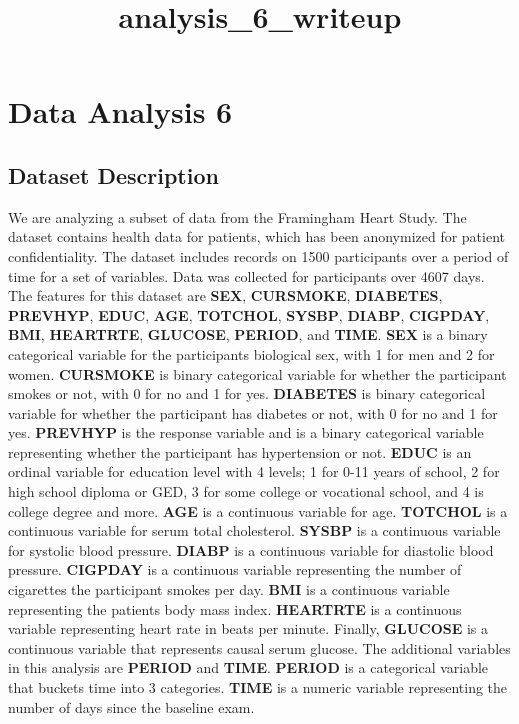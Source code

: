 \documentclass[11pt]{article}
\title{analysis\_6\_writeup}
\begin{document}
    
    
    \maketitle
    
    

    
    \hypertarget{data-analysis-6}{%
\section{Data Analysis 6}\label{data-analysis-6}}

    \hypertarget{dataset-description}{%
\subsection{Dataset Description}\label{dataset-description}}

    We are analyzing a subset of data from the Framingham Heart Study. The
dataset contains health data for patients, which has been anonymized for
patient confidentiality. The dataset includes records on 1500
participants over a period of time for a set of variables. Data was
collected for participants over 4607 days. The features for this dataset
are \textbf{SEX}, \textbf{CURSMOKE}, \textbf{DIABETES},
\textbf{PREVHYP}, \textbf{EDUC}, \textbf{AGE}, \textbf{TOTCHOL},
\textbf{SYSBP}, \textbf{DIABP}, \textbf{CIGPDAY}, \textbf{BMI},
\textbf{HEARTRTE}, \textbf{GLUCOSE}, \textbf{PERIOD}, and \textbf{TIME}.
\textbf{SEX} is a binary categorical variable for the participants
biological sex, with 1 for men and 2 for women. \textbf{CURSMOKE} is
binary categorical variable for whether the participant smokes or not,
with 0 for no and 1 for yes. \textbf{DIABETES} is binary categorical
variable for whether the participant has diabetes or not, with 0 for no
and 1 for yes. \textbf{PREVHYP} is the response variable and is a binary
categorical variable representing whether the participant has
hypertension or not. \textbf{EDUC} is an ordinal variable for education
level with 4 levels; 1 for 0-11 years of school, 2 for high school
diploma or GED, 3 for some college or vocational school, and 4 is
college degree and more. \textbf{AGE} is a continuous variable for age.
\textbf{TOTCHOL} is a continuous variable for serum total cholesterol.
\textbf{SYSBP} is a continuous variable for systolic blood pressure.
\textbf{DIABP} is a continuous variable for diastolic blood pressure.
\textbf{CIGPDAY} is a continuous variable representing the number of
cigarettes the participant smokes per day. \textbf{BMI} is a continuous
variable representing the patients body mass index. \textbf{HEARTRTE} is
a continuous variable representing heart rate in beats per minute.
Finally, \textbf{GLUCOSE} is a continuous variable that represents
causal serum glucose. The additional variables in this analysis are
\textbf{PERIOD} and \textbf{TIME}. \textbf{PERIOD} is a categorical
variable that buckets time into 3 categories. \textbf{TIME} is a numeric
variable representing the number of days since the baseline exam.
\end{document}
